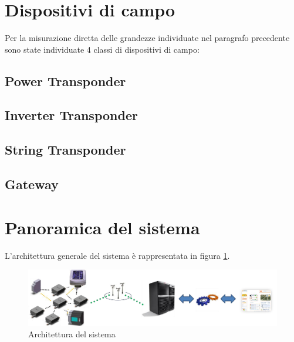 %
\section{Dispositivi di campo}
Per la misurazione diretta delle grandezze individuate nel paragrafo precedente 
sono state individuate 4 classi di dispositivi di campo:
\subsection{Power Transponder}
\subsection{Inverter Transponder}
\subsection{String Transponder}
\subsection{Gateway}





\section{Panoramica del sistema}
%
L'architettura generale del sistema \`e rappresentata in figura \ref{architettura-sistema}.
%
\begin{figure}[!h]
\centering
\includegraphics[width=400pt]{img/architecture.png}
\caption{Architettura del sistema}
\label{architettura-sistema}
\end{figure}
%

%











